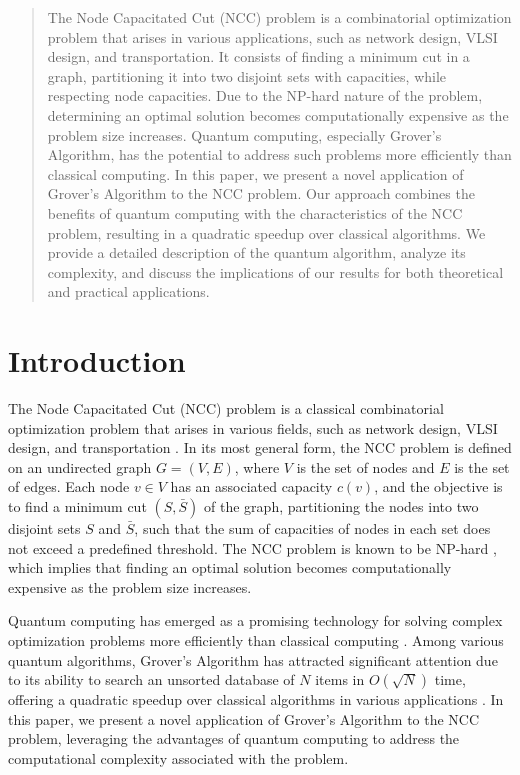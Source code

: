 
\begin{abstract}

The Node Capacitated Cut (NCC) problem is a combinatorial optimization problem that arises in various applications, such as network design, VLSI design, and transportation. It consists of finding a minimum cut in a graph, partitioning it into two disjoint sets with capacities, while respecting node capacities. Due to the NP-hard nature of the problem, determining an optimal solution becomes computationally expensive as the problem size increases. Quantum computing, especially Grover's Algorithm, has the potential to address such problems more efficiently than classical computing. In this paper, we present a novel application of Grover's Algorithm to the NCC problem. Our approach combines the benefits of quantum computing with the characteristics of the NCC problem, resulting in a quadratic speedup over classical algorithms. We provide a detailed description of the quantum algorithm, analyze its complexity, and discuss the implications of our results for both theoretical and practical applications.

\end{abstract}


\section{Introduction}

The Node Capacitated Cut (NCC) problem is a classical combinatorial optimization problem that arises in various fields, such as network design, VLSI design, and transportation \cite{NCC_problem}. In its most general form, the NCC problem is defined on an undirected graph $G=(V, E)$, where $V$ is the set of nodes and $E$ is the set of edges. Each node $v \in V$ has an associated capacity $c(v)$, and the objective is to find a minimum cut $(S, \bar{S})$ of the graph, partitioning the nodes into two disjoint sets $S$ and $\bar{S}$, such that the sum of capacities of nodes in each set does not exceed a predefined threshold. The NCC problem is known to be NP-hard \cite{NCC_NP_hard}, which implies that finding an optimal solution becomes computationally expensive as the problem size increases.

Quantum computing has emerged as a promising technology for solving complex optimization problems more efficiently than classical computing \cite{Quantum_computing}. Among various quantum algorithms, Grover's Algorithm \cite{Grover} has attracted significant attention due to its ability to search an unsorted database of $N$ items in $O(\sqrt{N})$ time, offering a quadratic speedup over classical algorithms in various applications \cite{Grover_applications}. In this paper, we present a novel application of Grover's Algorithm to the NCC problem, leveraging the advantages of quantum computing to address the computational complexity associated with the problem.

